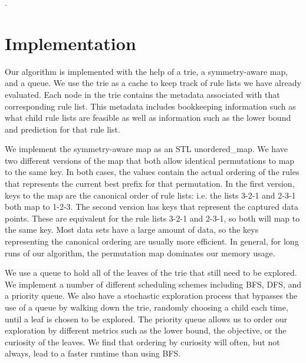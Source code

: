 \documentclass[sigconf]{acmart}
\begin{document}




\maketitle

\citet{YangRuSe16}.

\section{Implementation}

Our algorithm is implemented with the help of a trie, a symmetry-aware map, and a queue. We use the trie as a cache to keep track of rule lists we have already evaluated. Each node in the trie contains the metadata associated with that corresponding rule list. This metadata includes bookkeeping information such as what child rule lists are feasible as well as information such as the lower bound and prediction for that rule list. 

We implement the symmetry-aware map as an STL unordered\_map. We have two different versions of the map that both allow identical permutations to map to the same key. In both cases, the values contain the actual ordering of the rules that represents the current best prefix for that permutation. In the first version, keys to the map are the canonical order of rule lists: i.e. the lists 3-2-1 and 2-3-1 both map to 1-2-3. The second version has keys that represent the captured data points. These are equivalent for the rule lists 3-2-1 and 2-3-1, so both will map to the same key. Most data sets have a large amount of data, so the keys representing the canonical ordering are usually more efficient. In general, for long runs of our algorithm, the permutation map dominates our memory usage.

We use a queue to hold all of the leaves of the trie that still need to be explored. We implement a number of different scheduling schemes including BFS, DFS, and a priority queue. We also have a stochastic exploration process that bypasses the use of a queue by walking down the trie, randomly choosing a child each time, until a leaf is chosen to be explored. The priority queue allows us to order our exploration by different metrics such as the lower bound, the objective, or the curiosity of the leaves. We find that ordering by curiosity will often, but not always, lead to a faster runtime than using BFS.
\end{document}
